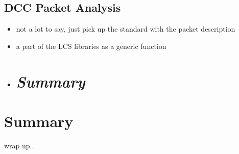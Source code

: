 \subsection{DCC Packet Analysis}

\begin{itemize}
\item not a lot to say, just pick up the standard with the packet description
\item a part of the LCS libraries as a generic function
\item \section{\textit{Summary}}
\end{itemize}

\section{Summary}

wrap up...
